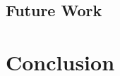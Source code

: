 \documentclass[10pt,sigconf,letterpaper,nonacm]{acmart}
\begin{document}
\subsection{Future Work}

\section{Conclusion}





\cite{10.1145/2388576.2388608}
\cite{10.5555/3432601.3432608}
\cite{10.1109/TNET.2014.2320577}
\cite{scikit-learn}
\cite{Wireshark}
\end{document}

